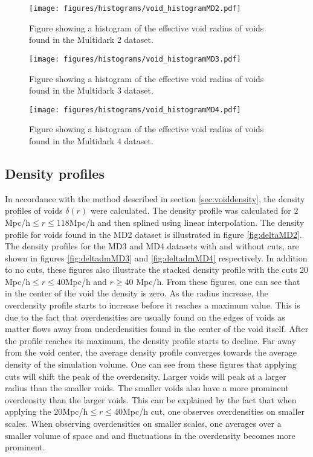\begin{figure}[H]
    \texttt{[image: figures/histograms/void\_histogramMD2.pdf]}
    \caption{Figure showing a histogram of the effective void radius of voids found in the Multidark 2 dataset.}
    \label{fig:voidhistMD2}
\end{figure}
\begin{figure}[H]
    \texttt{[image: figures/histograms/void\_histogramMD3.pdf]}
    \caption{Figure showing a histogram of the effective void radius of voids found in the Multidark 3 dataset.}
    \label{fig:voidhistMD3}
\end{figure}
\begin{figure}[H]
    \texttt{[image: figures/histograms/void\_histogramMD4.pdf]}
    \caption{Figure showing a histogram of the effective void radius of voids found in the Multidark 4 dataset.}
    \label{fig:voidhistMD4}
\end{figure}
\subsection{Density profiles}
In accordance with the method described in section \ref{sec:voiddensity}, the density profiles of voids $\delta(r)$ were calculated. The density profile was calculated for $2$Mpc/h$\leq r\leq 118$Mpc/h and then splined using linear interpolation. The density profile for voids found in the MD2 dataset is illustrated in figure \ref{fig:deltaMD2}. The density profiles for the MD3 and MD4 datasets with and without cuts, are shown in figures \ref{fig:deltadmMD3} and \ref{fig:deltadmMD4} respectively. In addition to no cuts, these figures also illustrate the stacked density profile with the cuts $20$Mpc/h$\leq r\leq 40$Mpc/h and $r\geq 40$ Mpc/h. From these figures, one can see that in the center of the void the density is zero. As the radius increase, the overdensity profile starts to increase before it reaches a maximum value. This is due to the fact that overdensities are usually found on the edges of voids as matter flows away from underdensities found in the center of the void itself. After the profile reaches its maximum, the density profile starts to decline. Far away from the void center, the average density profile converges towards the average density of the simulation volume. One can see from these figures that applying cuts will shift the peak of the overdensity. Larger voids will peak at a larger radius than the smaller voids. The smaller voids also have a more prominent overdensity than the larger voids. This can be explained by the fact that when applying the $20$Mpc/h$\leq r\leq 40$Mpc/h cut, one observes overdensities on smaller scales. When observing overdensities on smaller scales, one averages over a smaller volume of space and and fluctuations in the overdensity becomes more prominent.\\\indent
 
